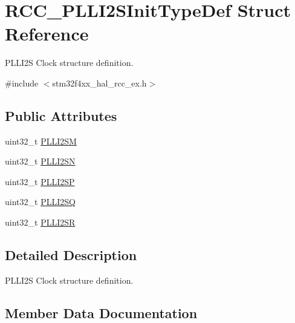 \hypertarget{struct_r_c_c___p_l_l_i2_s_init_type_def}{}\section{R\+C\+C\+\_\+\+P\+L\+L\+I2\+S\+Init\+Type\+Def Struct Reference}
\label{struct_r_c_c___p_l_l_i2_s_init_type_def}


P\+L\+L\+I2S Clock structure definition.  




{\ttfamily \#include $<$stm32f4xx\+\_\+hal\+\_\+rcc\+\_\+ex.\+h$>$}

\subsection*{Public Attributes}
\begin{DoxyCompactItemize}
\item 
uint32\+\_\+t \hyperlink{struct_r_c_c___p_l_l_i2_s_init_type_def_ab220aca5b6209623b23f0e4216d7fc6d}{P\+L\+L\+I2\+SM}
\item 
uint32\+\_\+t \hyperlink{struct_r_c_c___p_l_l_i2_s_init_type_def_a1edb776fccb621edb1405b3502ebc8eb}{P\+L\+L\+I2\+SN}
\item 
uint32\+\_\+t \hyperlink{struct_r_c_c___p_l_l_i2_s_init_type_def_a74f0f0ff8f1a603a598776745e384f5f}{P\+L\+L\+I2\+SP}
\item 
uint32\+\_\+t \hyperlink{struct_r_c_c___p_l_l_i2_s_init_type_def_a158ad7609d011d8f976556479cccb646}{P\+L\+L\+I2\+SQ}
\item 
uint32\+\_\+t \hyperlink{struct_r_c_c___p_l_l_i2_s_init_type_def_ad49056bf464bd58c0c0692c36b70b473}{P\+L\+L\+I2\+SR}
\end{DoxyCompactItemize}


\subsection{Detailed Description}
P\+L\+L\+I2S Clock structure definition. 

\subsection{Member Data Documentation}
